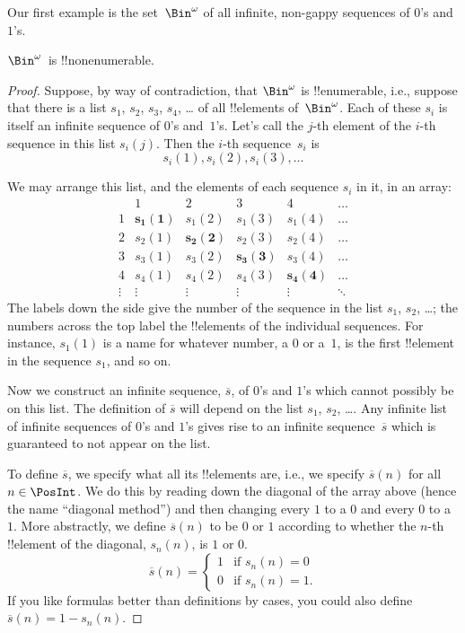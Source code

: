 Our first example is the set~$\Bin^\omega$ of all infinite, non-gappy
sequences of $0$'s and $1$'s.

\begin{thm}
$\Bin^\omega$~is !!{nonenumerable}.
\end{thm}

\begin{proof}
Suppose, by way of contradiction, that $\Bin^\omega$ is
!!{enumerable}, i.e., suppose that there is a list $s_{1}$, $s_{2}$,
$s_{3}$, $s_{4}$, \dots{} of all !!{element}s of~$\Bin^\omega$.  Each
of these $s_i$ is itself an infinite sequence of $0$'s and~$1$'s.
Let's call the $j$-th element of the $i$-th sequence in this list
$s_i(j)$. Then the $i$-th sequence~$s_i$ is
\[
s_i(1), s_i(2), s_i(3), \dots
\]

We may arrange this list, and the elements of each sequence $s_i$ in
it, in an array:
\[
\begin{array}{c|c|c|c|c|c}
& 1 & 2 & 3 & 4 & \dots \\\hline
1 & \mathbf{s_{1}(1)} & s_{1}(2) & s_{1}(3) & s_1(4) & \dots \\\hline
2 & s_{2}(1)& \mathbf{s_{2}(2)} & s_2(3) & s_2(4) & \dots \\\hline
3 & s_{3}(1)& s_{3}(2) & \mathbf{s_3(3)} & s_3(4) & \dots \\\hline
4 & s_{4}(1)& s_{4}(2) & s_4(3) & \mathbf{s_4(4)} & \dots \\\hline
\vdots & \vdots & \vdots & \vdots & \vdots & \mathbf{\ddots}
\end{array}
\]
The labels down the side give the number of the sequence in the list
$s_1$, $s_2$, \dots; the numbers across the top label the !!{element}s
of the individual sequences. For instance, $s_{1}(1)$ is a name for
whatever number, a $0$ or a~$1$, is the first !!{element} in the
sequence $s_{1}$, and so on.

Now we construct an infinite sequence, $\overline{s}$, of $0$'s and
$1$'s which cannot possibly be on this list.  The definition of
$\overline{s}$ will depend on the list $s_1$, $s_2$, \dots.  Any
infinite list of infinite sequences of $0$'s and $1$'s gives rise to
an infinite sequence~$\overline{s}$ which is guaranteed to not appear
on the list.

To define $\overline{s}$, we specify what all its !!{element}s are,
i.e., we specify $\overline{s}(n)$ for all $n \in \PosInt$.  We do this
by reading down the diagonal of the array above (hence the name
``diagonal method'') and then changing every $1$ to a $0$ and every
$0$ to a~$1$. More abstractly, we define $\overline{s}(n)$ to be $0$
or $1$ according to whether the $n$-th !!{element} of the diagonal,
$s_n(n)$, is $1$ or $0$.
\[
\overline{s}(n) =
\begin{cases}
1 & \text{if $s_{n}(n) = 0$}\\
0 & \text{if $s_{n}(n) = 1$}.
\end{cases}
\]
If you like formulas better than definitions by cases, you could also
define $\overline{s}(n) = 1 - s_n(n)$.


\end{proof}

